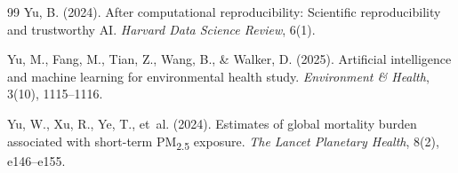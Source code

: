 \documentclass[12pt, a4paper]{article}
\begin{document}
\begin{thebibliography}{99}
Yu, B. (2024).
\newblock After computational reproducibility: Scientific reproducibility and trustworthy {AI}.
\newblock \emph{Harvard Data Science Review}, 6(1).

Yu, M., Fang, M., Tian, Z., Wang, B., \& Walker, D. (2025).
\newblock Artificial intelligence and machine learning for environmental health study.
\newblock \emph{Environment \& Health}, 3(10), 1115--1116.

Yu, W., Xu, R., Ye, T., et~al. (2024).
\newblock Estimates of global mortality burden associated with short-term PM\textsubscript{2.5} exposure.
\newblock \emph{The Lancet Planetary Health}, 8(2), e146--e155.

\end{thebibliography}
\end{document}
